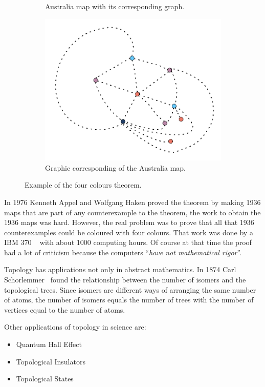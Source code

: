 \begin{figure}[h]
\begin{subfigure}[b]{0.28\linewidth}
\caption{Australia map with its corresponding graph.}
\end{subfigure}
\begin{subfigure}[b]{0.28\linewidth}
\includegraphics[width=\linewidth]{3/img/4_colors_australia_grafo}
\caption{Graphic corresponding of the Australia map.}
\end{subfigure}
\caption{Example of the four colours theorem.}
\label{australia}
\end{figure}

In 1976 Kenneth Appel and Wolfgang Haken proved the theorem by making 1936 maps
that are part of any counterexample to the theorem, the work
to obtain the 1936 maps was hard.
However, the real problem was to prove that all that 1936 counterexamples
could be coloured with four colours. That work was done by a IBM 370
~\cite{50cosas} with about \SI{1000}{} computing hours. Of course at that time
the proof had a lot of criticism because the computers ``\textit{have not
mathematical rigor}''.


Topology has applications not only in abstract mathematics.  In 1874 Carl
Schorlemmer~\cite{50cosas} found the relationship between the number of isomers
and the topological trees. Since isomers are different ways of arranging
the same number of atoms, the number of isomers equals the number of trees with the
number of vertices equal to the number of atoms.

Other applications of topology in science are:

\begin{itemize}
\item Quantum Hall Effect
\item Topological Insulators
\item Topological States
\end{itemize}



